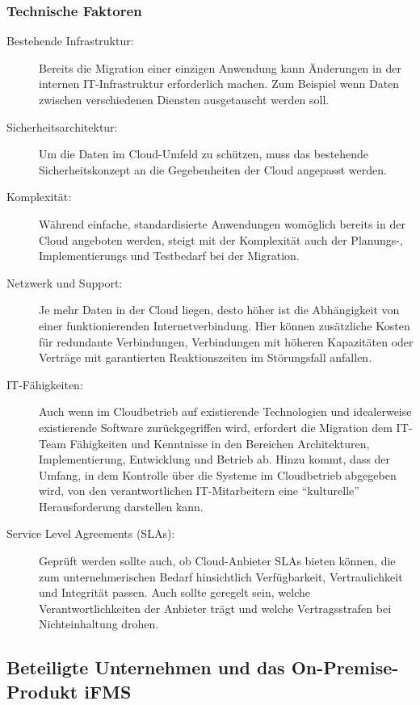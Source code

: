 \subsubsection{Technische Faktoren}
\begin{description}
	\item[Bestehende Infrastruktur:] Bereits die Migration einer
einzigen Anwendung kann Änderungen in der internen IT-Infrastruktur
erforderlich machen. Zum Beispiel wenn Daten zwischen verschiedenen Diensten
ausgetauscht werden soll.

	\item[Sicherheitsarchitektur:] Um die Daten im Cloud-Umfeld zu
schützen, muss das bestehende Sicherheitskonzept an die Gegebenheiten der Cloud
angepasst werden.

	\item[Komplexität:]
	Während einfache, standardisierte Anwendungen womöglich bereits in der
Cloud angeboten werden, steigt mit der Komplexität auch der Planungs-,
Implementierungs und Testbedarf bei der Migration.

	\item[Netzwerk und Support:] Je mehr Daten in der Cloud liegen, desto
höher ist die Abhängigkeit von einer funktionierenden Internetverbindung. Hier
können zusätzliche Kosten für redundante Verbindungen, Verbindungen mit höheren
Kapazitäten oder Verträge mit garantierten Reaktionszeiten im Störungsfall
anfallen.

	\item[IT-Fähigkeiten:] Auch wenn im Cloudbetrieb auf existierende
Technologien und idealerweise existierende Software zurückgegriffen wird,
erfordert die Migration dem IT-Team Fähigkeiten und Kenntnisse in den Bereichen
Architekturen, Implementierung, Entwicklung und Betrieb ab. Hinzu kommt, dass
der Umfang, in dem Kontrolle über die Systeme im Cloudbetrieb abgegeben wird,
von den verantwortlichen IT-Mitarbeitern eine "`kulturelle"' Herausforderung
darstellen kann.

	\item[Service Level Agreements (SLAs):] Geprüft werden sollte auch, ob
Cloud-Anbieter SLAs bieten können, die zum unternehmerischen Bedarf
hinsichtlich Verfügbarkeit, Vertraulichkeit und Integrität passen. Auch sollte
geregelt sein, welche Verantwortlichkeiten der Anbieter trägt und welche
Vertragsstrafen bei Nichteinhaltung drohen.
\end{description}


\subsection{Beteiligte Unternehmen und das On-Premise-Produkt iFMS}
\label{cha:replyundifms}


